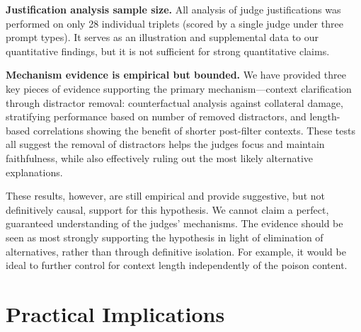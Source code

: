 \textbf{Justification analysis sample size.} All analysis of judge justifications was performed on only 28 individual triplets (scored by a single judge under three prompt types). It serves as an illustration and supplemental data to our quantitative findings, but it is not sufficient for strong quantitative claims.

\textbf{Mechanism evidence is empirical but bounded.} We have provided three key pieces of evidence supporting the primary mechanism---context clarification through distractor removal: counterfactual analysis against collateral damage, stratifying performance based on number of removed distractors, and length-based correlations showing the benefit of shorter post-filter contexts. These tests all suggest the removal of distractors helps the judges focus and maintain faithfulness, while also effectively ruling out the most likely alternative explanations.

These results, however, are still empirical and provide suggestive, but not definitively causal, support for this hypothesis. We cannot claim a perfect, guaranteed understanding of the judges' mechanisms. The evidence should be seen as most strongly supporting the hypothesis in light of elimination of alternatives, rather than through definitive isolation. For example, it would be ideal to further control for context length independently of the poison content.


\section{Practical Implications}

